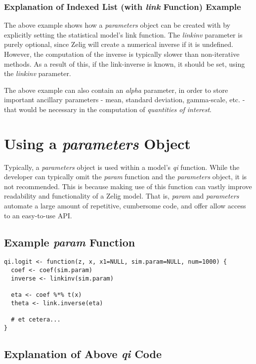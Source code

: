 \subsubsection{Explanation of Indexed List (with \emph{link} Function) Example}

The above example shows how a \emph{parameters} object can be created with by explicitly setting the statistical model's link function.  The \emph{linkinv} parameter is purely optional, since Zelig will create a numerical inverse if it is undefined.  However, the computation of the inverse is typically slower than non-iterative methods.  As a result of this, if the link-inverse is known, it should be set, using the \emph{linkinv} parameter.

The above example can also contain an \emph{alpha} parameter, in order to store important ancillary parameters - mean, standard deviation, gamma-scale, etc. - that would be necessary in the computation of \emph{quantities of interest}.


%
\section{Using a \emph{parameters} Object}

Typically, a \emph{parameters} object is used within a model's \emph{qi} function.  While the developer can typically omit the \emph{param} function and the \emph{parameters} object, it is not recommended.  This is because making use of this function can vastly improve readability and functionality of a Zelig model.  That is, \emph{param} and \emph{parameters} automate a large amount of repetitive, cumbersome code, and offer allow access to an easy-to-use API.

\subsection{Example \emph{param} Function}

\begin{verbatim}
qi.logit <- function(z, x, x1=NULL, sim.param=NULL, num=1000) {
  coef <- coef(sim.param)
  inverse <- linkinv(sim.param)

  eta <- coef %*% t(x)
  theta <- link.inverse(eta)

  # et cetera...
}

\end{verbatim}


\subsection{Explanation of Above \emph{qi} Code}

